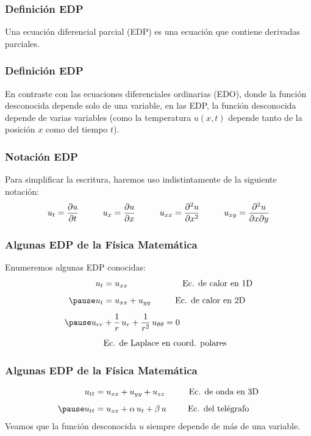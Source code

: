 \documentclass[12pt]{beamer}
\begin{document}
\begin{frame}
\frametitle{Definición EDP}
Una ecuación diferencial parcial (EDP) es una ecuación que contiene derivadas parciales. 
\end{frame}
\begin{frame}
\frametitle{Definición EDP}
En contraste con las ecuaciones diferenciales ordinarias (EDO), donde la función desconocida depende solo de una variable, \pause en las EDP, la función desconocida depende de varias variables (como la temperatura $u (x, t)$ depende tanto de la posición $x$ como del tiempo $t$).
\end{frame}
\begin{frame}
\frametitle{Notación EDP}
Para simplificar la escritura, haremos uso indistintamente de la siguiente notación:
\pause
\begin{align*}
u_{t} = \pdv{u}{t} \hspace{1cm} u_{x} = \pdv{u}{x} \hspace{1cm} u_{xx} = \pdv[2]{u}{x} \hspace{1cm} u_{xy} = \pdv[2]{u}{x}{y}
\end{align*}
\end{frame}
\begin{frame}
\frametitle{Algunas EDP de la Física Matemática}
Enumeremos algunas EDP conocidas:
\pause
\begin{eqnarray*}
\begin{aligned}
u_{t} &= u_{xx} \hspace{2.25cm} \mbox{Ec. de calor en 1D} \\[0.5em] \pause
u_{t} &= u_{xx} + u_{yy} \hspace{1cm} \mbox{Ec. de calor en 2D} \\[0.5em] \pause
u_{rr} &+ \dfrac{1}{r} \, u_{r} + \dfrac{1}{r^{2}} \, u_{\theta \theta} = 0 \\[0.5em]
&{} \mbox{Ec. de Laplace en coord. polares}
\end{aligned}
\end{eqnarray*}
\end{frame}
\begin{frame}
\frametitle{Algunas EDP de la Física Matemática}
\begin{eqnarray*}
\begin{aligned}
u_{tt} &= u_{xx} + u_{yy} + u_{zz} \hspace{1cm} \mbox{Ec. de onda en 3D} \\[0.5em] \pause
u_{tt} &= u_{xx} + \alpha \, u_{t} + \beta \, u \hspace{0.9cm} \mbox{Ec. del telégrafo}
\end{aligned}
\end{eqnarray*}
Veamos que la función desconocida $u$ siempre depende de más de una variable.
\end{frame}
\end{document}
